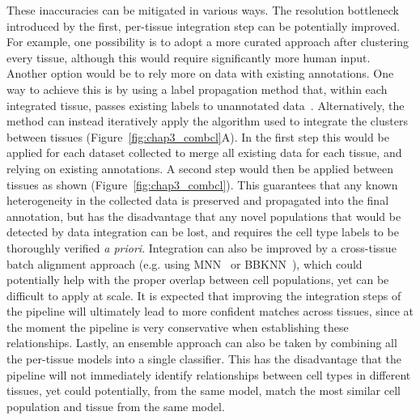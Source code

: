 These inaccuracies can be mitigated in various ways. The resolution bottleneck introduced by the first, per-tissue integration step can be potentially improved. For example, one possibility is to adopt a more curated approach after clustering every tissue, although this would require significantly more human input. Another option would be to rely more on data with existing annotations. One way to achieve this is by using a label propagation method that, within each integrated tissue, passes existing labels to unannotated data~\citep{barkas_joint_2019}. Alternatively, the method can instead iteratively apply the algorithm used to integrate the clusters between tissues (Figure~\ref{fig:chap3_combcl}A). In the first step this would be applied for each dataset collected to merge all existing data for each tissue, and relying on existing annotations. A second step would then be applied between tissues as shown (Figure~\ref{fig:chap3_combcl}). This guarantees that any known heterogeneity in the collected data is preserved and propagated into the final annotation, but has the disadvantage that any novel populations that would be detected by data integration can be lost, and requires the cell type labels to be thoroughly verified \textit{a priori}. Integration can also be improved by a cross-tissue batch alignment approach (e.g. using MNN~\citep{haghverdi_batch_2018} or BBKNN~\citep{polanski_bbknn:_2019}), which could potentially help with the proper overlap between cell populations, yet can be difficult to apply at scale. It is expected that improving the integration steps of the pipeline will ultimately lead to more confident matches across tissues, since at the moment the pipeline is very conservative when establishing these relationships. Lastly, an ensemble approach can also be taken by combining all the per-tissue models into a single classifier. This has the disadvantage that the pipeline will not immediately identify relationships between cell types in different tissues, yet could potentially, from the same model, match the most similar cell population and tissue from the same model.

